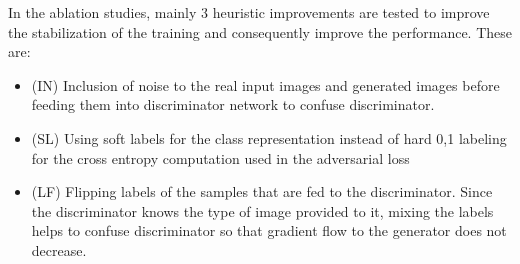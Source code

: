 \begin{table}[!h]
	\centering
	\caption{Ablation study for AnoGAN to test the effect of various training improvements for stabilization.}
	\label{tab:anogan_ablation}
\end{table}

In the ablation studies, mainly 3 heuristic improvements are tested to improve the stabilization of
the training and consequently improve the performance. These are:
\begin{itemize}
	\item {(IN) Inclusion of noise to the real input images and generated images before feeding them
		into discriminator network to confuse discriminator. }
	\item {(SL) Using soft labels for the class representation instead of hard 0,1 labeling for the
		cross entropy computation used in the adversarial loss}
	\item {(LF) Flipping labels of the samples that are fed to the discriminator. Since the
		discriminator knows the type of image provided to it, mixing the labels helps to confuse
		discriminator so that gradient flow to the generator does not decrease.}
\end{itemize}

